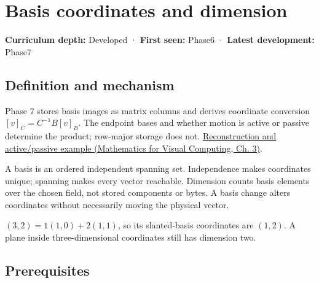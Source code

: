 \hypertarget{appendix-ce0341f7ea0d}{}\label{referencestart:appendix-ce0341f7ea0d}
\section{Basis coordinates and dimension}\label{appendix-ce0341f7ea0d-basis-coordinates-and-dimension}

\hypertarget{appendix-ce0341f7ea0d-basis-coordinates-and-dimension}{}

\textbf{Curriculum depth:} Developed · \textbf{First seen:} Phase6 · \textbf{Latest development:} Phase7

\begin{allmightroledefinition}

\subsection{Definition and mechanism}\label{appendix-ce0341f7ea0d-definition-and-mechanism}

\hypertarget{appendix-ce0341f7ea0d-definition-and-mechanism}{}

Phase 7 stores basis images as matrix columns and derives coordinate conversion \([v]_C=C^{-1}B[v]_B\). The endpoint bases and whether motion is active or passive determine the product; row-major storage does not. \href{../02-Mathematics-for-Visual-Computing/main.pdf\#nameddest=01-foundations-i-ch019-coordinates-can-change-while-the-geometric-object-stays-still}{Reconstruction and active/passive example (Mathematics for Visual Computing, Ch. 3)}.

\end{allmightroledefinition}

A basis is an ordered independent spanning set. Independence makes coordinates unique; spanning makes every vector reachable. Dimension counts basis elements over the chosen field, not stored components or bytes. A basis change alters coordinates without necessarily moving the physical vector.

\((3,2)=1(1,0)+2(1,1)\), so its slanted-basis coordinates are \((1,2)\). A plane inside three-dimensional coordinates still has dimension two.

\subsection{Prerequisites}\label{appendix-ce0341f7ea0d-prerequisites}

\hypertarget{appendix-ce0341f7ea0d-prerequisites}{}


